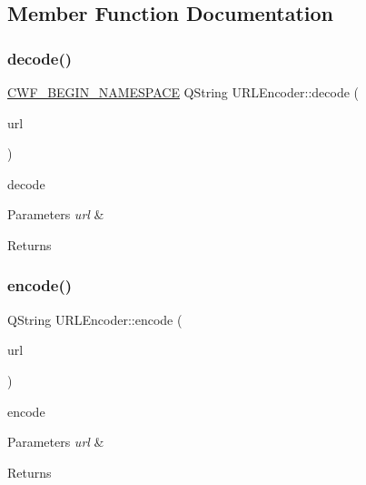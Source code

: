 \subsection{Member Function Documentation}
\mbox{\label{class_u_r_l_encoder_a109e17d4d839a70b56125c239918b639}} 
\subsubsection{\texorpdfstring{decode()}{decode()}}
{\footnotesize\ttfamily \hyperlink{cppwebframework__global_8h_a7492e9498cbaf9cd17dbc2215d3a0e48}{C\+W\+F\+\_\+\+B\+E\+G\+I\+N\+\_\+\+N\+A\+M\+E\+S\+P\+A\+CE} Q\+String U\+R\+L\+Encoder\+::decode (\begin{DoxyParamCaption}\item[{const Q\+Byte\+Array \&}]{url }\end{DoxyParamCaption})\hspace{0.3cm}{\ttfamily [static]}}



decode 


\begin{DoxyParams}{Parameters}
{\em url} & \\
\hline
\end{DoxyParams}
\begin{DoxyReturn}{Returns}

\end{DoxyReturn}
\mbox{\label{class_u_r_l_encoder_ad30f9c19d4629f268d54983d891db714}} 
\subsubsection{\texorpdfstring{encode()}{encode()}}
{\footnotesize\ttfamily Q\+String U\+R\+L\+Encoder\+::encode (\begin{DoxyParamCaption}\item[{const Q\+Byte\+Array \&}]{url }\end{DoxyParamCaption})\hspace{0.3cm}{\ttfamily [static]}}



encode 


\begin{DoxyParams}{Parameters}
{\em url} & \\
\hline
\end{DoxyParams}
\begin{DoxyReturn}{Returns}

\end{DoxyReturn}
\mbox{\label{class_u_r_l_encoder_a8780e1a9f6186726c83776a5c3543b6e}} 
